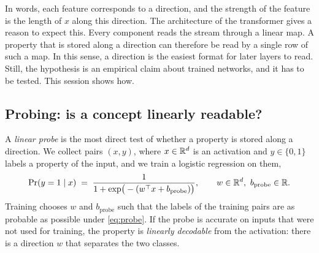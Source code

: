 In words, each feature corresponds to a direction, and the strength of the feature is the length of $x$ along
this direction. The architecture of the transformer gives a reason to expect this. Every component reads the stream
through a linear map. A property that is stored along a direction can therefore be read by a single row of such a
map. In this sense, a direction is the easiest format for later layers to read. Still, the hypothesis is an
empirical claim about trained networks, and it has to be tested. This session shows how.

\subsection{Probing: is a concept linearly readable?}

A \emph{linear probe} \citep{alain2017understanding} is the most direct test of whether a property is stored
along a direction. We collect pairs $(x,y)$, where $x\in\mathbb{R}^d$ is an activation and $y\in\{0,1\}$ labels a property
of the input, and we train a logistic regression on
them,
\begin{equation}\label{eq:probe}
\Pr(y=1\mid x) \;=\; \frac{1}{1+\exp\!\big(-(w^\top x+b_{\mathrm{probe}})\big)},\qquad w\in\mathbb{R}^d,\ b_{\mathrm{probe}}\in\mathbb{R} .
\end{equation}
Training chooses $w$ and $b_{\mathrm{probe}}$ such that the labels of the training pairs are as probable as
possible under \eqref{eq:probe}. If the probe is accurate on inputs that were not used for training, the property
is \emph{linearly decodable} from the activation: there is a direction $w$ that separates the two classes.


